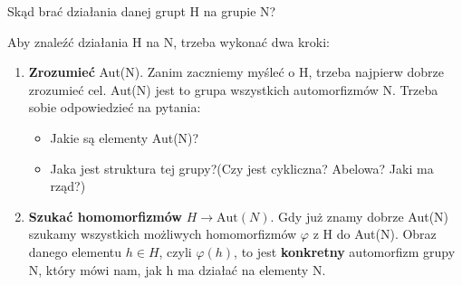 \begin{question}Skąd brać działania danej grupt H na grupie N?
\end{question}

\begin{remark}

Aby znaleźć działania H na N, trzeba wykonać dwa kroki:
\begin{enumerate}[label=\arabic*)]
	\item \textbf{Zrozumieć} Aut(N).
		Zanim zaczniemy myśleć o H, trzeba najpierw dobrze zrozumieć cel. Aut(N) jest to grupa wszystkich automorfizmów N. Trzeba sobie odpowiedzieć na pytania:
		\begin{itemize}
			\item Jakie są elementy Aut(N)?
			\item Jaka jest struktura tej grupy?(Czy jest cykliczna? Abelowa? Jaki ma rząd?)
		\end{itemize}
	\item \textbf{Szukać homomorfizmów } $H\rightarrow \text{Aut}(N)$.
	Gdy już znamy dobrze Aut(N) szukamy wszystkich możliwych homomorfizmów $\varphi$ z H do Aut(N). Obraz danego elementu $h \in H$, czyli $\varphi(h)$, to jest \textbf{konkretny} automorfizm grupy N, który mówi nam, jak h ma działać na elementy N.
\end{enumerate}


\end{remark}
